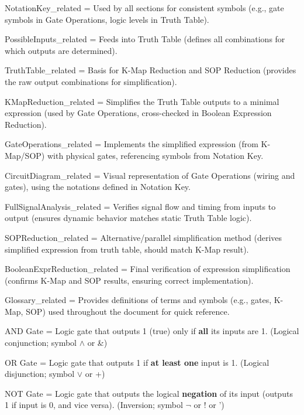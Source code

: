 \documentclass[11pt]{article}
\begin{document}
\vspace{0.5em}


\noindent NotationKey\_related     = Used by all sections for consistent symbols (e.g., gate symbols in Gate Operations, logic levels in Truth Table).

\noindent PossibleInputs\_related  = Feeds into Truth Table (defines all combinations for which outputs are determined).

\noindent TruthTable\_related      = Basis for K-Map Reduction and SOP Reduction (provides the raw output combinations for simplification).

\noindent KMapReduction\_related   = Simplifies the Truth Table outputs to a minimal expression (used by Gate Operations, cross-checked in Boolean Expression Reduction).

\noindent GateOperations\_related  = Implements the simplified expression (from K-Map/SOP) with physical gates, referencing symbols from Notation Key.

\noindent CircuitDiagram\_related  = Visual representation of Gate Operations (wiring and gates), using the notations defined in Notation Key.

\noindent FullSignalAnalysis\_related = Verifies signal flow and timing from inputs to output (ensures dynamic behavior matches static Truth Table logic).

\noindent SOPReduction\_related    = Alternative/parallel simplification method (derives simplified expression from truth table, should match K-Map result).

\noindent BooleanExprReduction\_related = Final verification of expression simplification (confirms K-Map and SOP results, ensuring correct implementation).

\noindent Glossary\_related        = Provides definitions of terms and symbols (e.g., gates, K-Map, SOP) used throughout the document for quick reference.

\vspace{0.5em}

\noindent [Glossary]

\noindent AND Gate = Logic gate that outputs 1 (true) only if \textbf{all} its inputs are 1. (Logical conjunction; symbol $\land$ or \&)

\noindent OR Gate  = Logic gate that outputs 1 if \textbf{at least one} input is 1. (Logical disjunction; symbol $\lor$ or +)

\noindent NOT Gate = Logic gate that outputs the logical \textbf{negation} of its input (outputs 1 if input is 0, and vice versa). (Inversion; symbol $\lnot$ or ! or ')
\end{document}
